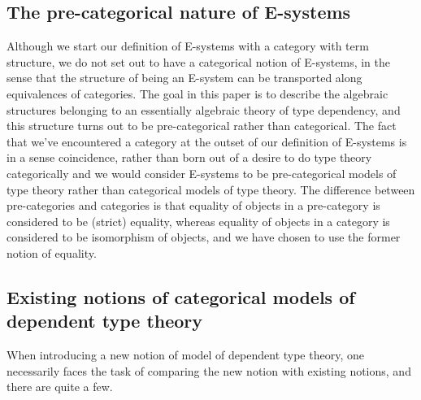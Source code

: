 \documentclass{article}
\begin{document}
\subsection*{The pre-categorical nature of E-systems}
Although we start our definition of E-systems with a category with term structure,
we do not set out to have a categorical notion of E-systems, in the sense that the structure of
being an E-system can be transported along equivalences of categories. The goal
in this paper is to describe the algebraic structures belonging to an essentially
algebraic theory of type dependency, and this structure turns out to be pre-categorical
rather than categorical. The fact that we've encountered a category at the outset
of our definition of E-systems is in a sense coincidence, rather than born out
of a desire to do type theory categorically and we would consider E-systems to
be pre-categorical models of type theory rather than categorical models of type
theory. The difference between pre-categories and categories is that equality
of objects in a pre-category is considered to be (strict) equality, whereas
equality of objects in a category is considered to be isomorphism of objects,
and we have chosen to use the former notion of equality.

\subsection*{Existing notions of categorical models of dependent type theory}

When introducing a new notion of model of dependent type theory, one necessarily
faces the task of comparing the new notion with existing notions, and there are
quite a few. 
\end{document}
